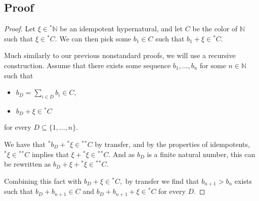 \documentclass[12pt]{amsart}
\newcommand{\stt}{{}^*}
\newcommand{\NN}{\mathbb{N}}
\theoremstyle{plain}
\theoremstyle{definition}
\theoremstyle{remark}
\theoremstyle{theorem}
\numberwithin{equation}{section}
\numberwithin{thm}{section}
\begin{document}
\subsection{Proof} 
\begin{proof}
Let $\xi \in \stt \NN$ be an idempotent hypernatural, and let $C$ be the color of $\NN$ such that $\xi \in \stt C.$ We can then pick some $b_1 \in C$ such that $b_1 + \xi \in \stt C.$

Much similarly to our previous nonstandard proofs, we will use a recursive construction. Assume that there exists some sequence $b_1, \ldots, b_n$ for some $n \in \NN$ such that 
\begin{itemize}
    \item $b_D = \sum_{i \in D}b_i \in C,$
    \item $b_D + \xi \in \stt C$
\end{itemize}
for every $D \subseteq \{1, \ldots , n\}.$

We have that $\stt b_D + \stt \xi \in \stt \stt C$ by transfer, and by the properties of idempotents, $\stt \xi \in \stt \stt C$ implies that $\xi + \stt \xi \in \stt \stt C.$ And as $b_D$ is a finite natural number, this can be rewritten as $b_D + \xi + \stt \xi \in \stt \stt C.$

Combining this fact with $b_D + \xi \in \stt C,$ by transfer we find that $b_{n+1} > b_n$ exists such that $b_D + b_{n+1} \in C$ and $b_D + b_{n+1} + \xi \in \stt C$ for every $D.$
\end{proof}
\end{document}
